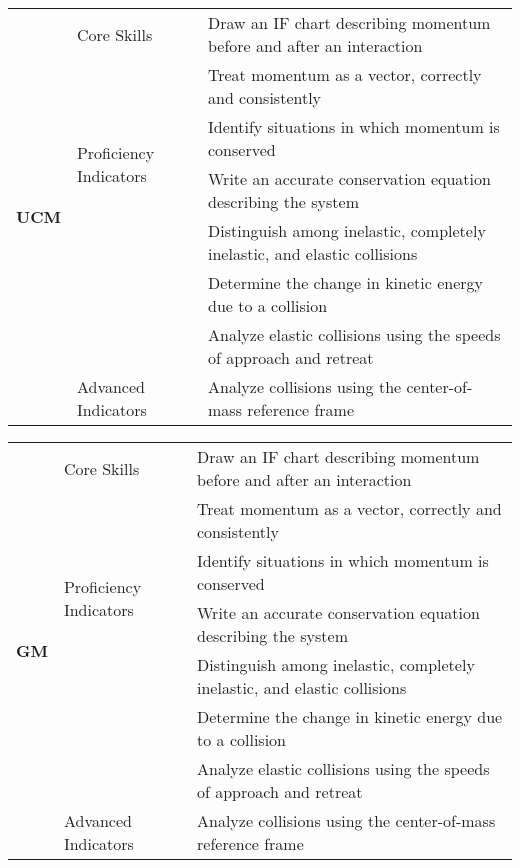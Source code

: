 \centering
{\footnotesize \begin{tabular}{| p{.35 cm} | p{1.7 cm} | p{14.3 cm} | }
\hline
\multirow{8}{*}{\begin{sideways}\parbox{4mm}{{\large{\bf UCM}}}\end{sideways}}  &Core Skills 		& Draw an IF chart describing momentum before and after an interaction  \\ \cline{3-3}
& 					& Treat momentum as a vector, correctly and consistently  \\ \cline{2-3}					
& \multirow{2}{*}{\parbox{1.7cm}{Proficiency Indicators}}	& Identify situations in which momentum is conserved \\ \cline{3-3}
&					& Write an accurate conservation equation describing the system \\ \cline{3-3}
& 					& Distinguish among inelastic, completely inelastic, and elastic collisions \\ \cline{3-3}
& 					& Determine the change in kinetic energy due to a collision \\ \cline{3-3}
&					& Analyze elastic collisions using the speeds of approach and retreat \\ \cline{2-3}
& Advanced Indicators	& Analyze collisions using the center-of-mass reference frame \\ \hline
\end{tabular} }
\vspace{2 mm}


\centering
{\footnotesize \begin{tabular}{| p{.35 cm} | p{1.7 cm} | p{14.3 cm} | }
\hline
\multirow{8}{*}{\begin{sideways}\parbox{4mm}{{\large{\bf GM}}}\end{sideways}}  &Core Skills 		& Draw an IF chart describing momentum before and after an interaction  \\ \cline{3-3}
& 					& Treat momentum as a vector, correctly and consistently  \\ \cline{2-3}					
& \multirow{2}{*}{\parbox{1.7cm}{Proficiency Indicators}}	& Identify situations in which momentum is conserved \\ \cline{3-3}
&					& Write an accurate conservation equation describing the system \\ \cline{3-3}
& 					& Distinguish among inelastic, completely inelastic, and elastic collisions \\ \cline{3-3}
& 					& Determine the change in kinetic energy due to a collision \\ \cline{3-3}
&					& Analyze elastic collisions using the speeds of approach and retreat \\ \cline{2-3}
& Advanced Indicators	& Analyze collisions using the center-of-mass reference frame \\ \hline
\end{tabular} }
\vspace{2 mm}



